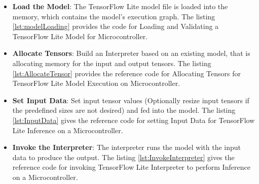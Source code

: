 \begin{itemize}
	\item \textbf{Load the Model}: The TensorFlow Lite model file  is loaded into the memory, which contains the model's execution graph. 
	The listing \ref{lst:modelLoading} provides the code for Loading and Validating a TensorFlow Lite Model for Microcontroller.

	\begin{code}
	
	\end{code}
	
	\item \textbf{Allocate Tensors}: Build an Interpreter based on an existing model, that is allocating memory for the input and output tensors. 
	The listing \ref{lst:AllocateTensor} provides the reference code for Allocating Tensors for TensorFlow Lite Model Execution on Microcontroller.

	\begin{code}
	
	\end{code}

	\item \textbf{Set Input Data}: Set input tensor values (Optionally resize input tensors if the predefined sizes are not desired) and fed into the model. 
	The listing \ref{lst:InputData} gives the reference code for setting Input Data for TensorFlow Lite Inference on a Microcontroller.
	\begin{code}
		
	\end{code}
	
	\item \textbf{Invoke the Interpreter}: The interpreter runs the model with the input data to produce the output. 
	The listing \ref{lst:InvokeInterpreter} gives the reference code for invoking TensorFlow Lite Interpreter to perform Inference on a Microcontroller.
	\begin{code}
		
	\end{code}
	

\end{itemize}
